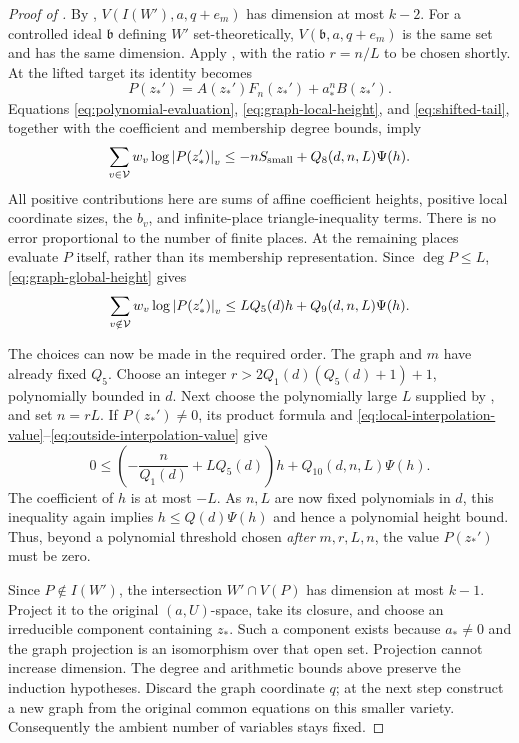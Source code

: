\begin{proof}[Proof of ]
By ,
$V(I(W'),a,q+e_m)$ has dimension at most $k-2$.
For a controlled ideal $\mathfrak b$ defining $W'$ set-theoretically,
$V(\mathfrak b,a,q+e_m)$ is the same set and has the same dimension.
Apply , with the ratio $r=n/L$ to be
chosen shortly.  At the lifted target its identity becomes
\[
 P(z_*')=A(z_*')F_n(z_*')+a_*^nB(z_*').
\]
Equations \eqref{eq:polynomial-evaluation},
\eqref{eq:graph-local-height}, and \eqref{eq:shifted-tail}, together
with the coefficient and membership degree bounds, imply
\begin{equation}\label{eq:local-interpolation-value}
 \sum_{v\in\mathcal V}w_v\log\left\lvert P(z_*')\right\rvert_v
 \leq -n S_{\rm small}+Q_8(d,n,L)\Psi(h).
\end{equation}
All positive contributions here are sums of affine coefficient heights,
positive local coordinate sizes, the $b_v$, and infinite-place
triangle-inequality terms.  There is no error proportional to the
number of finite places.
At the remaining places evaluate $P$ itself, rather than its membership
representation.  Since $\deg P\leq L$, \eqref{eq:graph-global-height}
gives
\begin{equation}\label{eq:outside-interpolation-value}
 \sum_{v\notin\mathcal V}w_v\log\left\lvert P(z_*')\right\rvert_v
 \leq LQ_5(d)h+Q_9(d,n,L)\Psi(h).
\end{equation}

The choices can now be made in the required order.  The graph and
$m$ have already fixed $Q_5$.  Choose an integer
$r>2Q_1(d)(Q_5(d)+1)+1$, polynomially bounded in $d$.
Next choose the polynomially large $L$ supplied by
, and set $n=rL$.
If $P(z_*')\ne0$, its product formula and
\eqref{eq:local-interpolation-value}--\eqref{eq:outside-interpolation-value}
give
\[
 0\leq
 \left(-\frac n{Q_1(d)}+LQ_5(d)\right)h
 +Q_{10}(d,n,L)\Psi(h).
\]
The coefficient of $h$ is at most $-L$.  As $n,L$ are now fixed
polynomials in $d$, this inequality
again implies $h\leq Q(d)\Psi(h)$ and hence a polynomial height
bound.  Thus, beyond a polynomial threshold chosen \emph{after}
$m,r,L,n$, the value $P(z_*')$ must be zero.

Since $P\notin I(W')$, the intersection $W'\cap V(P)$ has dimension
at most $k-1$.  Project it to the original $(a,U)$-space, take its
closure, and choose an irreducible component containing $z_*$.  Such
a component exists because $a_*\ne0$ and the graph projection is an
isomorphism over that open set.  Projection cannot increase dimension.
The degree and arithmetic bounds above preserve the induction
hypotheses.  Discard the graph coordinate $q$; at the next step construct
a new graph from the original common equations on this smaller
variety.  Consequently the ambient number of variables stays fixed.


\end{proof}
